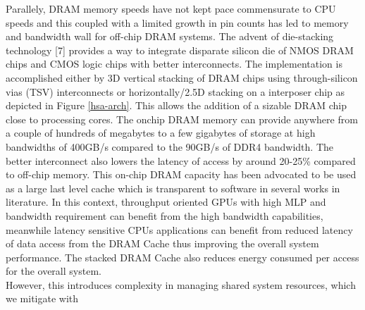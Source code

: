 Parallely, DRAM memory speeds have not kept pace commensurate to CPU speeds and this coupled with a limited growth in pin counts has led to memory and bandwidth wall for off-chip DRAM systems. The advent of die-stacking technology [7] provides a way to integrate disparate silicon die of NMOS DRAM chips and CMOS logic chips with better interconnects. The implementation is accomplished either by 3D vertical stacking of DRAM chips using through-silicon vias (TSV) interconnects or horizontally/2.5D stacking on a interposer chip as depicted in Figure \ref{hsa-arch}. This allows the addition of a sizable DRAM chip close to processing cores. The onchip DRAM memory can provide anywhere from a couple of hundreds of megabytes to a few gigabytes of storage at high bandwidths of 400GB/s compared to the 90GB/s of DDR4 bandwidth. The better interconnect also lowers the latency of access by around 20-25\% compared to off-chip memory. This on-chip DRAM capacity has been advocated to be used as a large last level cache which is transparent to software in several works in literature. In this context, throughput oriented GPUs with high MLP and bandwidth requirement can benefit from the high bandwidth capabilities, meanwhile latency sensitive CPUs applications can benefit from reduced latency of data access from the DRAM Cache thus improving the overall system performance. The stacked DRAM Cache also reduces energy consumed per access for the overall system. \\

However, this introduces complexity in managing shared system resources, which we mitigate with 


\begin{figure*}[!htb]
    \centering
    \hsacpu
    \caption{Architecture of a Integrated Heterogeneous System}
    \label{hsa-arch}
\end{figure*}
